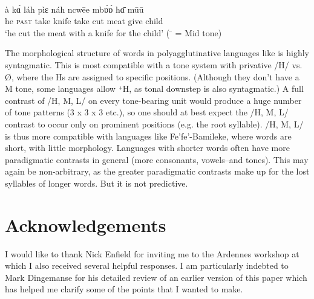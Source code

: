 \documentclass[output=paper]{langsci/langscibook}
\begin{document}
  \ex  
  \\
  \gll à   kɑ̀   láh  pìɛ   náh ncw\={e}e mbɒ̀ɒ̀  hɑ̄  m\={u}\={u} \\
      he \textsc{past} take knife take   cut       meat   give  child \\
  \glt    ‘he cut the meat with a knife for the child’
       (   \={ }  = Mid tone)

\z
\z

The morphological structure of words in polyagglutinative languages like  is highly syntagmatic. This is most compatible with a tone system with privative /H/ vs. Ø, where the Hs are assigned to specific positions. (Although they don’t have a M tone, some  languages allow \texttt{ꜜ\hspace*{-.2em}}H, as tonal downstep is also syntagmatic.) A full contrast of /H, M, L/ on every tone-bearing unit would produce a huge number of tone patterns (3 x 3 x 3 etc.), so one should at best expect the /H, M, L/ contrast to occur only on prominent positions (e.g. the root syllable). /H, M, L/ is thus more compatible with languages like Fe’fe’-Bamileke, where words are short, with little morphology. Languages with shorter words often have more paradigmatic contrasts in general (more consonants, vowels--and tones). This may again be non-arbitrary, as the greater paradigmatic contrasts make up for the lost syllables of longer words. But it is not predictive.

\section*{Acknowledgements}
I would like to thank Nick Enfield for inviting me to the Ardennes workshop at which I also received several helpful responses. I am particularly indebted to Mark Dingemanse for his detailed review of an earlier version of this paper which has helped me clarify some of the points that I wanted to make.


{\sloppy
\printbibliography[heading=subbibliography,notkeyword=this]
}
\end{document}
